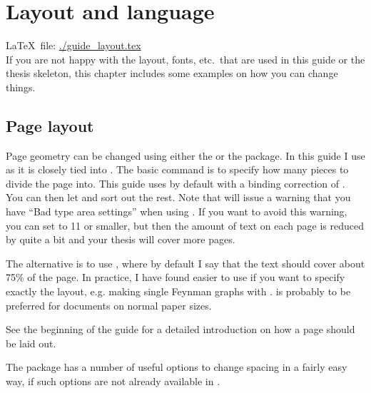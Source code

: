 \chapter{Layout and language}
\label{sec:layout}

\LaTeX\ file: \url{./guide_layout.tex}\\[1ex]
\noindent
If you are not happy with the layout, fonts, etc.\ that are used in
this guide or the thesis skeleton, this chapter includes some examples
on how you can change things.


\section{Page layout}
\label{sec:layout:page}


Page geometry can be changed using either the  or
the  package. In this guide I use 
as it is closely tied into \KOMAScript. The basic command is to
specify how many pieces to divide the page into. This guide uses
 by default with a binding correction of
.  You can then let \KOMAScript{} and
 sort out the rest. Note that 
will issue a warning that you have \enquote{Bad type area settings}
when using . If you want to avoid this warning, you can
set  to 11 or smaller, but then the amount of text on each
page is reduced by quite a bit and your thesis will cover more pages.

The alternative is to use , where by default I say
that the text should cover about 75\% of the page. In practice, I have
found  easier to use if you want to specify exactly
the layout, e.g. making single Feynman graphs with
.  is probably to be preferred for
documents on normal paper sizes.

See the beginning of the \KOMAScript{} guide for a detailed
introduction on how a page should be laid out.

The  package has a number of useful options to change
spacing in a fairly easy way, if such options are not already
available in \KOMAScript.


